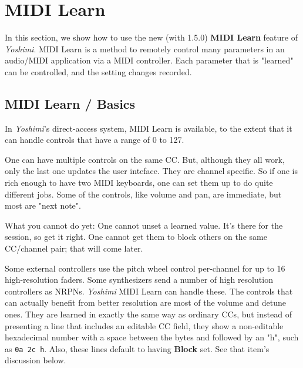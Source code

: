 %
%
%

\section{MIDI Learn}
\label{sec:midi_learn}

   In this section, we show how to use the new (with 1.5.0)
   \textbf{MIDI Learn} feature of \textsl{Yoshimi}.
   MIDI Learn is a method to remotely control many parameters in an audio/MIDI
   application via a MIDI controller.  Each parameter that is "learned" can be
   controlled, and the setting changes recorded.

\subsection{MIDI Learn / Basics}
\label{subsec:midi_learn_basics}

   In \textsl{Yoshimi}'s direct-access system, MIDI Learn is available, to
   the extent that it can handle controls that have a range of 0 to 127.

   One can have multiple controls on the same CC.  But, although they all work,
   only the last one updates the user inteface.  They are channel specific. So
   if one is rich enough to have two MIDI keyboards, one can set them up to do
   quite different jobs.
   Some of the controls, like volume and pan, are immediate, but most are "next
   note".

   What you cannot do yet: One cannot unset a learned value. It's there for the
   session, so get it right.  One cannot get them to block others on the same
   CC/channel pair; that will come later.

   Some external controllers use the pitch wheel control per-channel for up to 16
   high-resolution faders.
   Some synthesizers send a number of high resolution controllers as NRPNs.
   \textsl{Yoshimi} MIDI Learn can handle these.
   The controls that can actually benefit from better resolution are
   most of the volume and detune ones.
   They are learned in exactly the same way as ordinary CCs, but instead of
   presenting a line that includes an editable CC field, they show a non-editable
   hexadecimal number with a space between the bytes and followed by an "h",
   such as \texttt{0a 2c h}.
   Also, these lines default to having \textbf{Block} set.
   See that item's discussion below.


